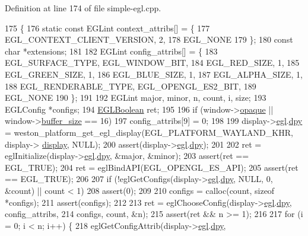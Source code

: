 Definition at line 174 of file simple-\/egl.\+cpp.


\begin{DoxyCode}
175 \{
176     \textcolor{keyword}{static} \textcolor{keyword}{const} EGLint context\_attribs[] = \{
177         EGL\_CONTEXT\_CLIENT\_VERSION, 2,
178         EGL\_NONE
179     \};
180     \textcolor{keyword}{const} \textcolor{keywordtype}{char} *extensions;
181 
182     EGLint config\_attribs[] = \{
183         EGL\_SURFACE\_TYPE, EGL\_WINDOW\_BIT,
184         EGL\_RED\_SIZE, 1,
185         EGL\_GREEN\_SIZE, 1,
186         EGL\_BLUE\_SIZE, 1,
187         EGL\_ALPHA\_SIZE, 1,
188         EGL\_RENDERABLE\_TYPE, EGL\_OPENGL\_ES2\_BIT,
189         EGL\_NONE
190     \};
191 
192     EGLint major, minor, n, count, i, size;
193     EGLConfig *configs;
194     \hyperlink{simple-egl_8cpp_ab4ad070d3bf82abe5e70330578f67893}{EGLBoolean} ret;
195 
196     \textcolor{keywordflow}{if} (window->\hyperlink{structwindow_a026a50808d8323a5a73d585c19916fa8}{opaque} || window->\hyperlink{structwindow_a0e634038f669aff472012f25ea250b40}{buffer\_size} == 16)
197         config\_attribs[9] = 0;
198 
199     display->\hyperlink{structdisplay_a8b8bc104c19ff228d476a377e572d9c7}{egl}.\hyperlink{structdisplay_a8a1cbda15a286e41e89a85f158ce9311}{dpy} = weston\_platform\_get\_egl\_display(EGL\_PLATFORM\_WAYLAND\_KHR, display->
      \hyperlink{structdisplay_aa8faf09631925e9221fd8a0c086ce75a}{display}, NULL);
200     assert(display->\hyperlink{structdisplay_a8b8bc104c19ff228d476a377e572d9c7}{egl}.\hyperlink{structdisplay_a8a1cbda15a286e41e89a85f158ce9311}{dpy});
201 
202     ret = eglInitialize(display->\hyperlink{structdisplay_a8b8bc104c19ff228d476a377e572d9c7}{egl}.\hyperlink{structdisplay_a8a1cbda15a286e41e89a85f158ce9311}{dpy}, &major, &minor);
203     assert(ret == EGL\_TRUE);
204     ret = eglBindAPI(EGL\_OPENGL\_ES\_API);
205     assert(ret == EGL\_TRUE);
206 
207     \textcolor{keywordflow}{if} (!eglGetConfigs(display->\hyperlink{structdisplay_a8b8bc104c19ff228d476a377e572d9c7}{egl}.\hyperlink{structdisplay_a8a1cbda15a286e41e89a85f158ce9311}{dpy}, NULL, 0, &count) || count < 1)
208         assert(0);
209 
210     configs = calloc(count, \textcolor{keyword}{sizeof} *configs);
211     assert(configs);
212 
213     ret = eglChooseConfig(display->\hyperlink{structdisplay_a8b8bc104c19ff228d476a377e572d9c7}{egl}.\hyperlink{structdisplay_a8a1cbda15a286e41e89a85f158ce9311}{dpy}, config\_attribs,
214                   configs, count, &n);
215     assert(ret && n >= 1);
216 
217     \textcolor{keywordflow}{for} (i = 0; i < n; i++) \{
218         eglGetConfigAttrib(display->\hyperlink{structdisplay_a8b8bc104c19ff228d476a377e572d9c7}{egl}.\hyperlink{structdisplay_a8a1cbda15a286e41e89a85f158ce9311}{dpy},

\end{DoxyCode}
